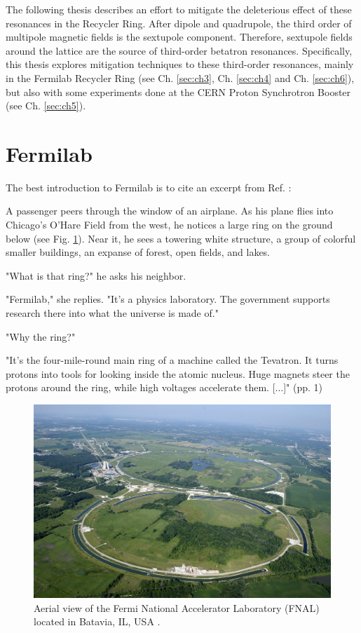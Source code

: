 The following thesis describes an effort to mitigate the deleterious effect of these resonances in the Recycler Ring. After dipole and quadrupole, the third order of multipole magnetic fields is the sextupole component. Therefore, sextupole fields around the lattice are the source of third-order betatron resonances. Specifically, this thesis explores mitigation techniques to these third-order resonances, mainly in the Fermilab Recycler Ring (see Ch. \ref{sec:ch3}, Ch. \ref{sec:ch4} and Ch. \ref{sec:ch6}), but also with some experiments done at the CERN Proton Synchrotron Booster (see Ch. \ref{sec:ch5}). 

\section{Fermilab}

The best introduction to Fermilab is to cite an excerpt from Ref. \cite{fermilab1}:
\begin{displayquote}
    \begin{flushleft}
    [...] A passenger peers through the window of an airplane. As his plane flies into Chicago's O'Hare Field from the west, he notices a large ring on the ground below (see Fig. \ref{fig:fermia}). Near it, he sees a towering white structure, a group of colorful smaller buildings, an expanse of forest, open fields, and lakes.

    "What is that ring?" he asks his neighbor.

    "Fermilab," she replies. "It's a physics laboratory. The government supports research there into what the universe is made of."

    "Why the ring?"

    "It's the four-mile-round main ring of a machine called the Tevatron. It turns protons into tools for looking inside the atomic nucleus. Huge magnets steer the protons around the ring, while high voltages accelerate them. [...]" (pp. 1)
    \end{flushleft}
\end{displayquote}
\begin{figure}[H]
    \centering
    \includegraphics[width=\columnwidth]{chapter1/fermilab.jpeg}
    \caption{Aerial view of the Fermi National Accelerator Laboratory (FNAL) located in Batavia, IL, USA \cite{fermipic}.}
    \label{fig:fermia}
    \vspace{-1.25em}
 \end{figure}


